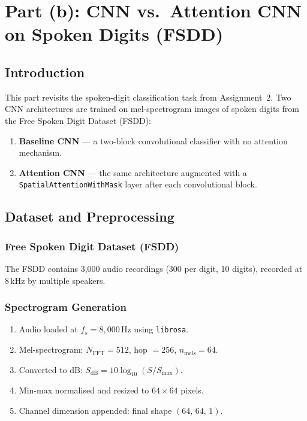 \documentclass[12pt,a4paper]{article}
\begin{document}
\newpage
\section{Part (b): CNN vs.\ Attention CNN on Spoken Digits (FSDD)}

\subsection{Introduction}

This part revisits the spoken-digit classification task from Assignment~2. Two CNN
architectures are trained on mel-spectrogram images of spoken digits from the Free
Spoken Digit Dataset (FSDD):

\begin{enumerate}[leftmargin=1.5em]
    \item \textbf{Baseline CNN} — a two-block convolutional classifier with no
          attention mechanism.
    \item \textbf{Attention CNN} — the same architecture augmented with a
          \texttt{SpatialAttentionWithMask} layer after each convolutional block.
\end{enumerate}

\subsection{Dataset and Preprocessing}

\subsubsection{Free Spoken Digit Dataset (FSDD)}

The FSDD contains 3,000 audio recordings (300 per digit, 10 digits), recorded at
8\,kHz by multiple speakers.

\subsubsection{Spectrogram Generation}

\begin{enumerate}[leftmargin=1.5em]
    \item Audio loaded at $f_s = 8{,}000$\,Hz using \texttt{librosa}.
    \item Mel-spectrogram: $N_\text{FFT}=512$, hop $= 256$, $n_\text{mels} = 64$.
    \item Converted to dB: $S_\text{dB} = 10\log_{10}(S/S_\text{max})$.
    \item Min-max normalised and resized to $64\times64$ pixels.
    \item Channel dimension appended: final shape $(64,\,64,\,1)$.
\end{enumerate}
\end{document}
